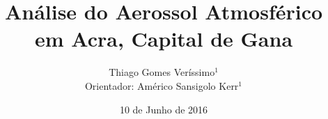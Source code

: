 \documentclass{beamer}
\begin{document}
  \title{Análise do Aerossol Atmosférico em Acra, Capital de Gana}
  \author{Thiago Gomes Veríssimo$^1$ \\
          Orientador: Américo Sansigolo Kerr$^1$}
  \date{10 de Junho de 2016}

\begin{frame}
  \titlepage
\end{frame}

\begin{frame}
  \tableofcontents
\end{frame}


\end{document}
